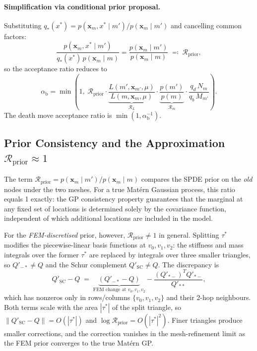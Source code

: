 \documentclass[11pt]{article}
\begin{document}
\paragraph{Simplification via conditional prior proposal.}
Substituting $q_*(x^*)=p(\mathbf{x}_m,x^*\mid m')/p(\mathbf{x}_m\mid m')$
and cancelling common factors:
\begin{equation}
  \frac{p(\mathbf{x}_m,x^*\mid m')}
       {q_*(x^*)\,p(\mathbf{x}_m\mid m)}
  = \frac{p(\mathbf{x}_m\mid m')}{p(\mathbf{x}_m\mid m)}
  \;\eqqcolon\; \mathcal{R}_\mathrm{prior},
\end{equation}
so the acceptance ratio reduces to
\begin{equation}
  \alpha_\mathrm{b} = \min\!\left(1,\;
    \mathcal{R}_\mathrm{prior}
    \cdot
    \underbrace{\frac{L(m',\mathbf{x}_{m'},\mu)}
                     {L(m,\mathbf{x}_m,\mu)}}_{\mathcal{R}_L}
    \cdot
    \underbrace{\frac{p(m')}{p(m)}}_{\mathcal{R}_m}
    \cdot\frac{q_d\,N_m}{q_b\,M_{m'}}
  \right).
  \label{eq:rj-acc}
\end{equation}
The death move acceptance ratio is $\min(1,\alpha_\mathrm{b}^{-1})$.

\subsection{Prior Consistency and the Approximation $\mathcal{R}_\mathrm{prior}\approx 1$}
\label{sec:rj-prior}

The term $\mathcal{R}_\mathrm{prior} = p(\mathbf{x}_m\mid m')/p(\mathbf{x}_m\mid m)$
compares the SPDE prior on the \emph{old} nodes under the two meshes.
For a true Mat\'ern Gaussian process, this ratio equals 1 exactly: the GP
consistency property guarantees that the marginal at any fixed set of
locations is determined solely by the covariance function, independent of
which additional locations are included in the model.

For the \emph{FEM-discretised} prior, however, $\mathcal{R}_\mathrm{prior}\neq 1$
in general.  Splitting $\tau^*$ modifies the piecewise-linear basis functions
at $v_0,v_1,v_2$: the stiffness and mass integrals over the former $\tau^*$
are replaced by integrals over three smaller triangles, so $Q'_{-*}\neq Q$ and
the Schur complement $Q'_\mathrm{SC} \neq Q$.  The discrepancy is
\begin{equation}
  Q'_\mathrm{SC} - Q \;=\;
  \underbrace{(Q'_{-*} - Q)}_{\text{FEM change at }v_0,v_1,v_2}
  - \frac{(Q'_{*-})^T Q'_{*-}}{Q'_{**}},
  \label{eq:SC-diff}
\end{equation}
which has nonzeros only in rows/columns $\{v_0,v_1,v_2\}$ and their
2-hop neighbours.  Both terms scale with the area $|\tau^*|$ of the split
triangle, so $\|Q'_\mathrm{SC}-Q\|=O(|\tau^*|)$ and
$\log\mathcal{R}_\mathrm{prior}=O(|\tau^*|^2)$.  Finer triangles produce
smaller corrections, and the correction vanishes in the mesh-refinement limit
as the FEM prior converges to the true Matérn GP.
\end{document}
